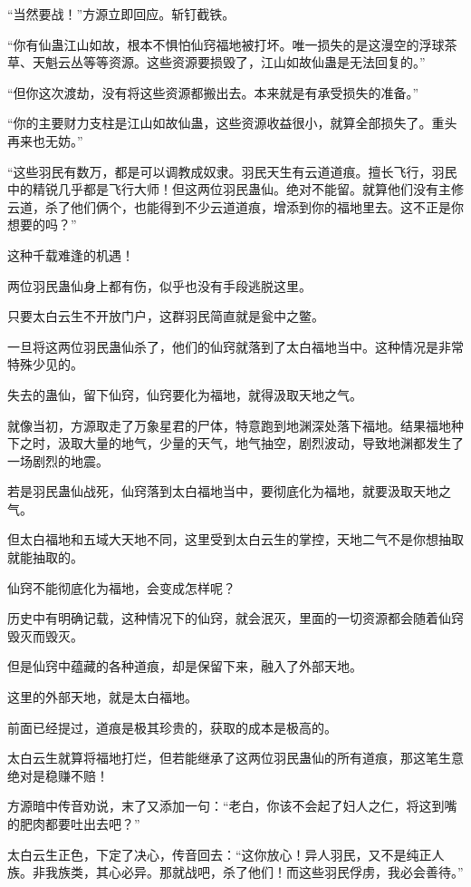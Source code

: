 \begin{this_body}
“当然要战！”方源立即回应。斩钉截铁。

“你有仙蛊江山如故，根本不惧怕仙窍福地被打坏。唯一损失的是这漫空的浮球茶草、天魁云丛等等资源。这些资源要损毁了，江山如故仙蛊是无法回复的。”

“但你这次渡劫，没有将这些资源都搬出去。本来就是有承受损失的准备。”

“你的主要财力支柱是江山如故仙蛊，这些资源收益很小，就算全部损失了。重头再来也无妨。”

“这些羽民有数万，都是可以调教成奴隶。羽民天生有云道道痕。擅长飞行，羽民中的精锐几乎都是飞行大师！但这两位羽民蛊仙。绝对不能留。就算他们没有主修云道，杀了他们俩个，也能得到不少云道道痕，增添到你的福地里去。这不正是你想要的吗？”

这种千载难逢的机遇！

两位羽民蛊仙身上都有伤，似乎也没有手段逃脱这里。

只要太白云生不开放门户，这群羽民简直就是瓮中之鳖。

一旦将这两位羽民蛊仙杀了，他们的仙窍就落到了太白福地当中。这种情况是非常特殊少见的。

失去的蛊仙，留下仙窍，仙窍要化为福地，就得汲取天地之气。

就像当初，方源取走了万象星君的尸体，特意跑到地渊深处落下福地。结果福地种下之时，汲取大量的地气，少量的天气，地气抽空，剧烈波动，导致地渊都发生了一场剧烈的地震。

若是羽民蛊仙战死，仙窍落到太白福地当中，要彻底化为福地，就要汲取天地之气。

但太白福地和五域大天地不同，这里受到太白云生的掌控，天地二气不是你想抽取就能抽取的。

仙窍不能彻底化为福地，会变成怎样呢？

历史中有明确记载，这种情况下的仙窍，就会泯灭，里面的一切资源都会随着仙窍毁灭而毁灭。

但是仙窍中蕴藏的各种道痕，却是保留下来，融入了外部天地。

这里的外部天地，就是太白福地。

前面已经提过，道痕是极其珍贵的，获取的成本是极高的。

太白云生就算将福地打烂，但若能继承了这两位羽民蛊仙的所有道痕，那这笔生意绝对是稳赚不赔！

方源暗中传音劝说，末了又添加一句：“老白，你该不会起了妇人之仁，将这到嘴的肥肉都要吐出去吧？”

太白云生正色，下定了决心，传音回去：“这你放心！异人羽民，又不是纯正人族。非我族类，其心必异。那就战吧，杀了他们！而这些羽民俘虏，我必会善待。”


\end{this_body}
